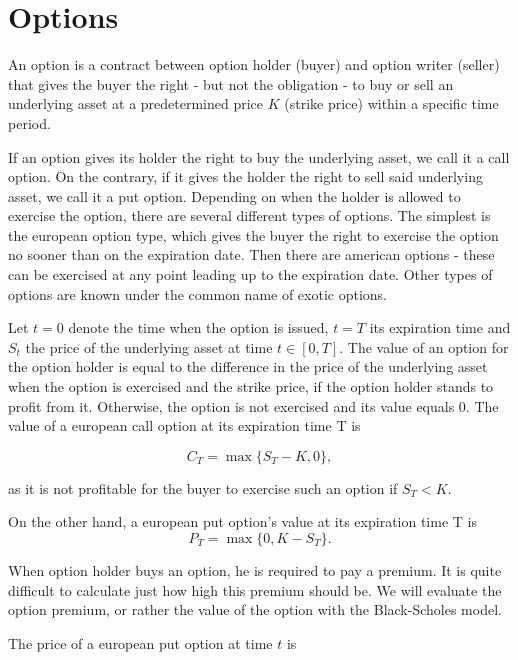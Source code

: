 \documentclass[a4paper, 12pt]{article}
\theoremstyle{definition}
\theoremstyle{plain}
\theoremstyle{definition}
\begin{document}
\section{Options}
\label{ch:options}
An option is a contract between option holder (buyer) 
and option writer (seller) that gives the buyer the right - 
but not the obligation - to buy or sell an underlying asset at a 
predetermined price $K$ (strike price) within a specific 
time period.

If an option gives its holder the right to buy the underlying asset,
we call it a call option. On the contrary, if it gives the holder the 
right to sell said underlying asset, we call it a put option. 
Depending on when the holder is allowed to exercise the option, 
there are several different types of options. 
The simplest is the european option type, which gives the buyer the right to 
exercise the option no sooner than on the expiration date. 
Then there are american options - these can be exercised at any point  
leading up to the expiration date. Other types of options are known 
under the common name of exotic options.

Let $t=0$ denote the time when the option is issued, $t=T$ its expiration time and
$S_t$ the price of the underlying asset at time $t\in[0,T]$.
The value of an option for the option holder is equal to the difference in the 
price of the underlying asset when the option is exercised and the strike price, 
if the option holder stands to profit from it. Otherwise, the option is not exercised 
and its value equals 0. The value of a european call option at its expiration time T is

\begin{equation}
    C_T = \max\{S_T-K,0\},
\end{equation}

as it is not profitable for the buyer to exercise such an option if $S_T<K$.

On the other hand, a european put option's value at its expiration time T is
\begin{equation}
    P_T = \max\{0, K-S_T\}.
\end{equation}

When option holder buys an option, he is required to pay a premium. 
It is quite difficult to calculate just how high this premium should be.
We will evaluate the option premium, or rather the value of the option
with the Black-Scholes model.

The price of a european put option at time $t$ is
\end{document}
